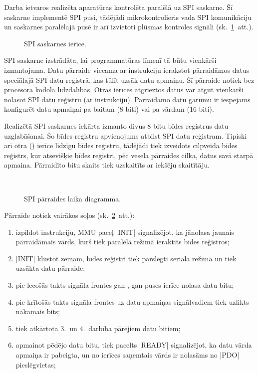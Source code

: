 		Darba ietvaros realizēta aparatūras kontrolēta paralēlā uz SPI saskarne.
		Šī saskarne implementē SPI  pusi, tādējādi mikrokontrolieris
		vada SPI komunikāciju un saskarnes paralēlajā pusē ir arī izvietoti
		plūsmas kontroles signāli (sk.~\ref{fig:spi}~att.).
		
		\begin{figure}[thp]
			\centering
			\def\svgscale{1.25}
			{\ttfamily\scriptsize}
			\caption{SPI saskarnes ierīce.}
			\label{fig:spi}
		\end{figure}
		
		SPI saskarne izstrādāta, lai programmatūras līmenī tā būtu vienkārši
		izmantojama. Datu pārraide viecama ar  instrukciju ierakstot
		pārraidāmos datus speciālajā SPI datu reģistrā, kas tūlīt uzsāk datu
		apmaiņu. Šī pārraide notiek bez procesora kodola līdzdalības.
		Otras ierīces atgrieztos datus var atgūt vienkārši nolasot
		SPI datu reģistru (ar  instrukciju). Pārraidāmo datu garumu
		ir iespējams konfigurēt datu apmaiņai pa baitam (8 biti) vai
		pa vārdam (16 biti).
		
		Realizētā SPI saskarnes iekārta izmanto divus 8 bitu bīdes reģistrus
		datu uzglabāšanai. Šo bīdes reģistru apvienojums atbilst SPI datu reģistram.
		Tipiski arī otra ()
		ierīce līdzīgu bīdes reģistru, tādējādi tiek izveidots cilpveida
		bīdes reģistrs, kur atsevišķie bīdes reģistri, pēc vesela pārraides cilka,
		datus savā starpā apmaina. Pārraidīto bitu skaits tiek uzskaitīts
		ar iekšēju skaitītāju. 
		\begin{figure}[th]
			\centering
			\def\svgwidth{\textwidth}
			{\ttfamily\footnotesize}\\
			\caption{SPI pārraides laika diagramma.}
			\label{fig:spi-tx}
		\end{figure}
		Pārraide notiek vairākos soļos
		(sk.~\ref{fig:spi-tx}~att.):
		\begin{enumerate}
			\item izpildot  instrukciju, MMU paceļ |INIT|
				signalizējot, ka jānolasa jaunais pārraidāmais vārds, kurš
				tiek paralēlā režīmā ieraktīts bīdes reģistros;
			\item |INIT| kļūstot zemam, bīdes reģistri tiek pārslēgti
				seriālā režīmā un tiek uzsākta datu pārraide;
			\item pie lecošās takts signāla frontes gan ,
				gan  puses ierīce nolasa datu bitu;
			\item pie krītošās takts signāla frontes uz datu apmaiņas
				signālvadiem tiek uzlikts nākamais bits;
			\item tiek atkārtota 3.~un 4.~darbība pārējiem datu bitiem;
			\item apmainot pēdējo datu bitu, tiek pacelts |READY|
				signalizējot, ka datu vārda apmaiņa ir pabeigta, un no
				 ierīces
				saņemtais vārds ir nolasāms no |PDO| pieslēgvietas;
		\end{enumerate}
		
